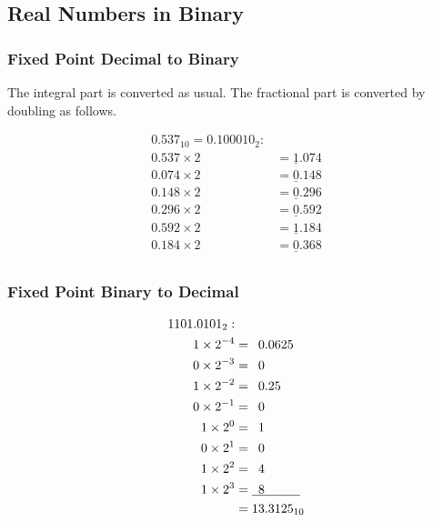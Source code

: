 \subsection{Real Numbers in Binary}

\subsubsection{Fixed Point Decimal to Binary}

The integral part is converted as usual.
The fractional part is converted by doubling as follows.

\vspace{-\baselineskip}

\begin{align*}
  {0.537}_{10} = {0.100010}_{2} : & \\
  0.537 \times 2 &= \underline{1}.074 \\
  0.074 \times 2 &= \underline{0}.148 \\
  0.148 \times 2 &= \underline{0}.296 \\
  0.296 \times 2 &= \underline{0}.592 \\
  0.592 \times 2 &= \underline{1}.184 \\
  0.184 \times 2 &= \underline{0}.368 \\
\end{align*}

\subsubsection{Fixed Point Binary to Decimal}

\begin{align*}
  {1101.0101}_{2} : & \\
  1 \times 2 ^ {-4} &=            \hphantom{0}0.0625              \\
  0 \times 2 ^ {-3} &=            \hphantom{0}0                   \\
  1 \times 2 ^ {-2} &=            \hphantom{0}0.25                \\
  0 \times 2 ^ {-1} &=            \hphantom{0}0                   \\
  1 \times 2 ^   0  &=            \hphantom{0}1                   \\
  0 \times 2 ^   1  &=            \hphantom{0}0                   \\
  1 \times 2 ^   2  &=            \hphantom{0}4                   \\
  1 \times 2 ^   3  &= \underline{\hphantom{0}8\hphantom{.00000}} \\
                    &=           {\hphantom{}13.3125}_{10}        \\
\end{align*}

